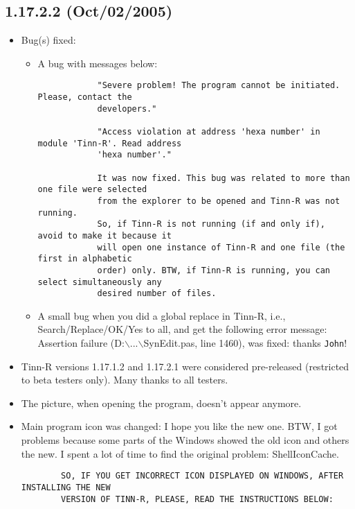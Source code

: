 \subsection*{1.17.2.2 (Oct/02/2005)}
\begin{itemize}
  \item Bug(s) fixed:
    \begin{itemize}
      \item A bug with messages below:

        \begin{footnotesize}
          \begin{verbatim}
            "Severe problem! The program cannot be initiated. Please, contact the
            developers."

            "Access violation at address 'hexa number' in module 'Tinn-R'. Read address
            'hexa number'."

            It was now fixed. This bug was related to more than one file were selected
            from the explorer to be opened and Tinn-R was not running.
            So, if Tinn-R is not running (if and only if), avoid to make it because it
            will open one instance of Tinn-R and one file (the first in alphabetic
            order) only. BTW, if Tinn-R is running, you can select simultaneously any
            desired number of files.
          \end{verbatim}
        \end{footnotesize}

      \item A small bug when you did a global replace in Tinn-R, i.e.,
        Search/Replace/OK/Yes to all, and get the following error message:
        Assertion failure (D:$\backslash$...$\backslash$SynEdit.pas,
        line 1460), was fixed: thanks \texttt{John}!
    \end{itemize}
  \item Tinn-R versions 1.17.1.2 and 1.17.2.1 were considered pre-released
    (restricted to beta testers only). Many thanks to all testers.
  \item The picture, when opening the program, doesn't appear anymore.
  \item Main program icon was changed: I hope you like the new one.
    BTW, I got problems because some parts of the Windows showed the
    old icon and others the new. I spent a lot of time to find the
    original problem: ShellIconCache.

    \begin{footnotesize}
      \begin{verbatim}
        SO, IF YOU GET INCORRECT ICON DISPLAYED ON WINDOWS, AFTER INSTALLING THE NEW
        VERSION OF TINN-R, PLEASE, READ THE INSTRUCTIONS BELOW:


\end{verbatim}
\end{footnotesize}
\end{itemize}
